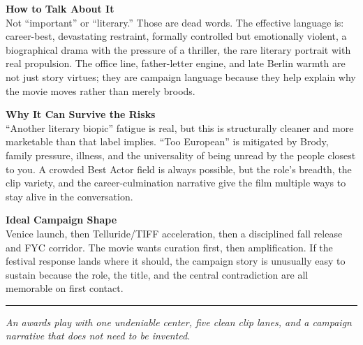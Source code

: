 \documentclass[11pt,letterpaper]{article}
\begin{document}
\vspace{2pt}

\textbf{How to Talk About It}\\
Not ``important'' or ``literary.'' Those are dead words. The effective language is: career-best, devastating restraint, formally controlled but emotionally violent, a biographical drama with the pressure of a thriller, the rare literary portrait with real propulsion. The office line, father-letter engine, and late Berlin warmth are not just story virtues; they are campaign language because they help explain why the movie moves rather than merely broods.

\vspace{2pt}

\textbf{Why It Can Survive the Risks}\\
``Another literary biopic'' fatigue is real, but this is structurally cleaner and more marketable than that label implies. ``Too European'' is mitigated by Brody, family pressure, illness, and the universality of being unread by the people closest to you. A crowded Best Actor field is always possible, but the role's breadth, the clip variety, and the career-culmination narrative give the film multiple ways to stay alive in the conversation.

\vspace{2pt}

\textbf{Ideal Campaign Shape}\\
Venice launch, then Telluride/TIFF acceleration, then a disciplined fall release and FYC corridor. The movie wants curation first, then amplification. If the festival response lands where it should, the campaign story is unusually easy to sustain because the role, the title, and the central contradiction are all memorable on first contact.

\vspace{4pt}
\textcolor{sectionrule}{\rule{\textwidth}{0.5pt}}
\vspace{2pt}
\begin{center}
{\small\color{kafkalight}\textit{An awards play with one undeniable center, five clean clip lanes, and a campaign narrative that does not need to be invented.}}
\end{center}
\end{document}
